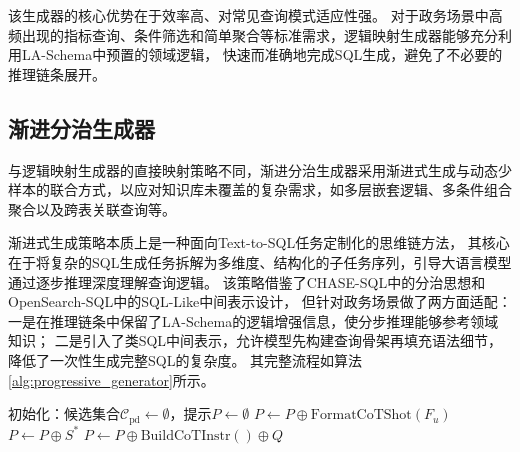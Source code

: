 该生成器的核心优势在于效率高、对常见查询模式适应性强。
对于政务场景中高频出现的指标查询、条件筛选和简单聚合等标准需求，逻辑映射生成器能够充分利用LA-Schema中预置的领域逻辑，
快速而准确地完成SQL生成，避免了不必要的推理链条展开。

\subsection{渐进分治生成器}

与逻辑映射生成器的直接映射策略不同，渐进分治生成器采用渐进式生成与动态少样本的联合方式，以应对知识库未覆盖的复杂需求，如多层嵌套逻辑、多条件组合聚合以及跨表关联查询等。

渐进式生成策略本质上是一种面向Text-to-SQL任务定制化的思维链方法\cite{wei2022chain}，
其核心在于将复杂的SQL生成任务拆解为多维度、结构化的子任务序列，引导大语言模型通过逐步推理深度理解查询逻辑。
该策略借鉴了CHASE-SQL\cite{pourreza2024chase}中的分治思想和OpenSearch-SQL\cite{xie2025opensearch}中的SQL-Like中间表示设计，
但针对政务场景做了两方面适配：一是在推理链条中保留了LA-Schema的逻辑增强信息，使分步推理能够参考领域知识；
二是引入了类SQL中间表示，允许模型先构建查询骨架再填充语法细节，降低了一次性生成完整SQL的复杂度。
其完整流程如算法\ref{alg:progressive_generator}所示。

\begin{algorithm}[htbp]
初始化：候选集合$\mathcal{C}_{\text{pd}} \leftarrow \emptyset$，提示$P \leftarrow \emptyset$\;
$P \leftarrow P \oplus \text{FormatCoTShot}(F_u)$
$P \leftarrow P \oplus S^{*}$
$P \leftarrow P \oplus \text{BuildCoTInstr}() \oplus Q$
\caption{渐进分治生成算法}
\label{alg:progressive_generator}
\end{algorithm}

